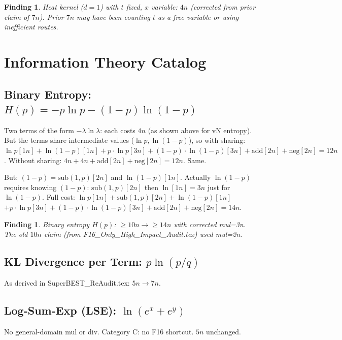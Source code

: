 \documentclass[11pt]{article}
\newtheorem{finding}[theorem]{Finding}
\newcommand{\ok}[1]{\textcolor{ok}{#1}}
\newcommand{\flag}[1]{\textcolor{flag}{#1}}
\begin{document}
\begin{finding}
Heat kernel ($d=1$) with $t$ fixed, $x$ variable: \ok{$4n$ (corrected from prior claim of $7n$)}.
Prior $7n$ may have been counting $t$ as a free variable or using inefficient routes.
\end{finding}

\section{Information Theory Catalog}

\subsection{Binary Entropy: $H(p) = -p\ln p - (1-p)\ln(1-p)$}

Two terms of the form $-\lambda\ln\lambda$: each costs $4n$ (as shown above for vN entropy).
But the terms share intermediate values ($\ln p, \ln(1-p)$), so with sharing:
$\ln p[1n] + \ln(1-p)[1n] + p \cdot \ln p [3n] + (1-p)\cdot\ln(1-p)[3n] + \mathrm{add}[2n] + \mathrm{neg}[2n] = 12n$.
Without sharing: $4n + 4n + \mathrm{add}[2n] + \mathrm{neg}[2n] = 12n$. Same.

But: $(1-p) = \mathrm{sub}(1,p)[2n]$ and $\ln(1-p)[1n]$.
Actually $\ln(1-p)$ requires knowing $(1-p)$: $\mathrm{sub}(1,p)[2n]$ then $\ln[1n] = 3n$ just for $\ln(1-p)$.
Full cost: $\ln p[1n] + \mathrm{sub}(1,p)[2n] + \ln(1-p)[1n]$
$+ p\cdot\ln p[3n] + (1-p)\cdot\ln(1-p)[3n] + \mathrm{add}[2n] + \mathrm{neg}[2n] = 14n$.

\begin{finding}
Binary entropy $H(p)$: \flag{$\geq 10n \to \geq 14n$} with corrected mul=3n.
The old $10n$ claim (from F16\_Only\_High\_Impact\_Audit.tex) used mul=2n.
\end{finding}

\subsection{KL Divergence per Term: $p \ln(p/q)$}

As derived in SuperBEST\_ReAudit.tex: \flag{$5n \to 7n$}.

\subsection{Log-Sum-Exp (LSE): $\ln(e^x + e^y)$}

No general-domain mul or div. Category C: no F16 shortcut. \ok{$5n$ unchanged.}
\end{document}

